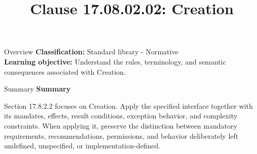 \documentclass[10pt,letterpaper]{article}
\title{Clause 17.08.02.02: Creation}
\author{}
\date{}
\begin{document}
\maketitle
\begin{CornellOverviewBox}{Overview}
\textbf{Classification:} Standard library - Normative\\[2pt]
\textbf{Learning objective:} Understand the rules, terminology, and semantic consequences associated with Creation.
\end{CornellOverviewBox}\begin{CornellSummaryBox}{Summary}
{\sffamily\bfseries\color{Accent} Summary}\par\vspace{3pt}Section 17.8.2.2 focuses on Creation. Apply the specified interface together with its mandates, effects, result conditions, exception behavior, and complexity constraints. When applying it, preserve the distinction between mandatory requirements, recommendations, permissions, and behavior deliberately left undefined, unspecified, or implementation-defined.
\end{CornellSummaryBox}
\end{document}
